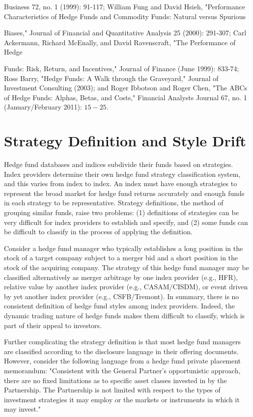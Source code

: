 \documentclass[11pt]{article}
\begin{document}
Business 72, no. 1 (1999): 91-117; William Fung and David Hsieh, "Performance Characteristics of Hedge Funds and Commodity Funds: Natural versus Spurious

Biases," Journal of Financial and Quantitative Analysis 25 (2000): 291-307; Carl Ackermann, Richard McEnally, and David Ravenscraft, "The Performance of Hedge

Funds: Risk, Return, and Incentives," Journal of Finance (June 1999): 833-74; Ross Barry, "Hedge Funds: A Walk through the Graveyard," Journal of Investment Consulting (2003); and Roger Ibbotson and Roger Chen, "The ABCs of Hedge Funds: Alphas, Betas, and Costs," Financial Analysts Journal 67, no. 1 (January/February 2011): $15-25$.

\section*{Strategy Definition and Style Drift}
Hedge fund databases and indices subdivide their funds based on strategies. Index providers determine their own hedge fund strategy classification system, and this varies from index to index. An index must have enough strategies to represent the broad market for hedge fund returns accurately and enough funds in each strategy to be representative. Strategy definitions, the method of grouping similar funds, raise two problems: (1) definitions of strategies can be very difficult for index providers to establish and specify, and (2) some funds can be difficult to classify in the process of applying the definition.

Consider a hedge fund manager who typically establishes a long position in the stock of a target company subject to a merger bid and a short position in the stock of the acquiring company. The strategy of this hedge fund manager may be classified alternatively as merger arbitrage by one index provider (e.g., HFR), relative value by another index provider (e.g., CASAM/CISDM), or event driven by yet another index provider (e.g., CSFB/Tremont). In summary, there is no consistent definition of hedge fund styles among index providers. Indeed, the dynamic trading nature of hedge funds makes them difficult to classify, which is part of their appeal to investors.

Further complicating the strategy definition is that most hedge fund managers are classified according to the disclosure language in their offering documents. However, consider the following language from a hedge fund private placement memorandum: "Consistent with the General Partner's opportunistic approach, there are no fixed limitations as to specific asset classes invested in by the Partnership. The Partnership is not limited with respect to the types of investment strategies it may employ or the markets or instruments in which it may invest."
\end{document}
